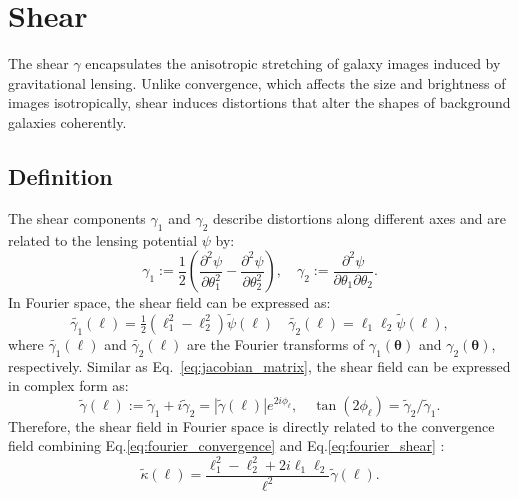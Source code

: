 \section{Shear}
The shear $\gamma$ encapsulates the anisotropic stretching of galaxy images induced by gravitational lensing. Unlike convergence, which affects the size and brightness of images isotropically, shear induces distortions that alter the shapes of background galaxies coherently. 
\subsection{Definition}
The shear components $\gamma_1$ and $\gamma_2$ describe distortions along different axes and are related to the lensing potential $\psi$ by:
\begin{equation}
    \label{eq:physical_shear}
    \gamma_1 := \frac{1}{2} \left( \frac{\partial^2 \psi}{\partial \theta_1^2} - \frac{\partial^2 \psi}{\partial \theta_2^2} \right), \quad \gamma_2 := \frac{\partial^2 \psi}{\partial \theta_1 \partial \theta_2}.
\end{equation}
In Fourier space, the shear field can be expressed as:
\begin{equation}
    \label{eq:fourier_shear}
    \tilde{\gamma_1}(\boldsymbol{\ell}) = \tfrac{1}{2} \left( \ell_1^2 - \ell_2^2 \right) \tilde{\psi}(\boldsymbol{\ell}) \quad
    \tilde{\gamma_2}(\boldsymbol{\ell}) = \ell_1 \ell_2 \tilde{\psi}(\boldsymbol{\ell}) ,
\end{equation}
where $\tilde{\gamma_1}(\boldsymbol{\ell})$ and $\tilde{\gamma_2}(\boldsymbol{\ell})$ are the Fourier transforms of $\gamma_1(\boldsymbol{\theta})$ and $\gamma_2(\boldsymbol{\theta})$, respectively. 
Similar as Eq.~\eqref{eq:jacobian_matrix}, the shear field can be expressed in complex form as:
\begin{equation}
    \label{eq:fourier_shear1}
    \tilde{\gamma}(\boldsymbol{\ell}) := \tilde{\gamma}_1 + i\tilde{\gamma}_2 = |\tilde{\gamma}(\boldsymbol{\ell})|e^{2i\phi_\ell}, \quad \tan (2\phi_\ell) = \tilde{\gamma}_2 / \tilde{\gamma}_1.
\end{equation}
Therefore, the shear field in Fourier space is directly related to the convergence field combining Eq.\eqref{eq:fourier_convergence} and Eq.\eqref{eq:fourier_shear} \citep{1993ApJ...404..441K}:
\begin{equation}
    \tilde{\kappa}(\boldsymbol{\ell}) = \frac{\ell_1^2 - \ell_2^2 + 2i\ell_1\ell_2}{\ell^2} \tilde{\gamma}(\boldsymbol{\ell}).
    \label{eq:kappa_gamma_relation}
\end{equation}
